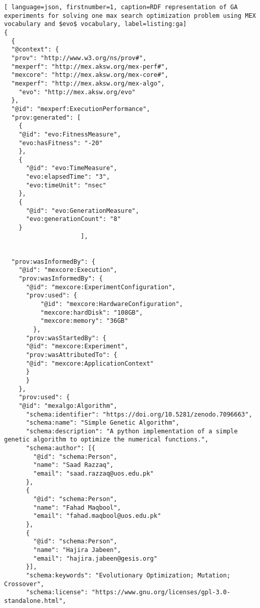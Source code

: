 \documentclass[preprint,12pt]{elsarticle}
\begin{document}
\begin{lstlisting}[ language=json, firstnumber=1, caption=RDF representation of GA experiments for solving one max search optimization problem using MEX vocabulary and $evo$ vocabulary, label=listing:ga]
{
  {
  "@context": {
  "prov": "http://www.w3.org/ns/prov#",
  "mexperf": "http://mex.aksw.org/mex-perf#",
  "mexcore": "http://mex.aksw.org/mex-core#",
  "mexperf": "http://mex.aksw.org/mex-algo",
    "evo": "http://mex.aksw.org/evo"
  },
  "@id": "mexperf:ExecutionPerformance",
  "prov:generated": [	
    {
    "@id": "evo:FitnessMeasure",
    "evo:hasFitness": "-20"
    },
    {
      "@id": "evo:TimeMeasure",
      "evo:elapsedTime": "3",
      "evo:timeUnit": "nsec"
    },
    {
      "@id": "evo:GenerationMeasure",
      "evo:generationCount": "8"
    }    
                     ],


  "prov:wasInformedBy": {
    "@id": "mexcore:Execution",
    "prov:wasInformedBy": {
      "@id": "mexcore:ExperimentConfiguration",
      "prov:used": {
          "@id": "mexcore:HardwareConfiguration",
          "mexcore:hardDisk": "108GB",
          "mexcore:memory": "36GB"
        },
      "prov:wasStartedBy": {
      "@id": "mexcore:Experiment",
      "prov:wasAttributedTo": {
      "@id": "mexcore:ApplicationContext"
      }
      }
    },
    "prov:used": {
    "@id": "mexalgo:Algorithm",
      "schema:identifier": "https://doi.org/10.5281/zenodo.7096663",
      "schema:name": "Simple Genetic Algorithm",
      "schema:description": "A python implementation of a simple genetic algorithm to optimize the numerical functions.",
      "schema:author": [{
        "@id": "schema:Person",
        "name": "Saad Razzaq",
        "email": "saad.razzaq@uos.edu.pk"
      },
      {
        "@id": "schema:Person",
        "name": "Fahad Maqbool",
        "email": "fahad.maqbool@uos.edu.pk"
      },
      {
        "@id": "schema:Person",
        "name": "Hajira Jabeen",
        "email": "hajira.jabeen@gesis.org"
      }],
      "schema:keywords": "Evolutionary Optimization; Mutation; Crossover",
      "schema:license": "https://www.gnu.org/licenses/gpl-3.0-standalone.html",
      

\end{lstlisting}
\end{document}

